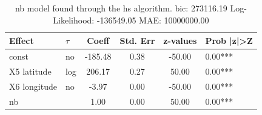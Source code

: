 \begin{table}
	\caption{nb model found through the hs algorithm. bic: 273116.19 Log-Likelihood: -136549.05 MAE: 10000000.00}
	\begin{center}
		\begin{tabular}{|l|l|c|c|c|l|}
			\hline
			Effect & $\tau$ & Coeff & Std. Err & z-values & Prob |z|>Z \\
			\hline
			const & no & -185.48 & 0.38 & -50.00 & 0.00*** \\
			\hline
			X5 latitude & log & 206.17 & 0.27 & 50.00 & 0.00*** \\
			\hline
			X6 longitude & no & -3.97 & 0.00 & -50.00 & 0.00*** \\
			\hline
			nb &  & 1.00 & 0.00 & 50.00 & 0.00*** \\
			\hline
		\end{tabular}
	\end{center}
\end{table}